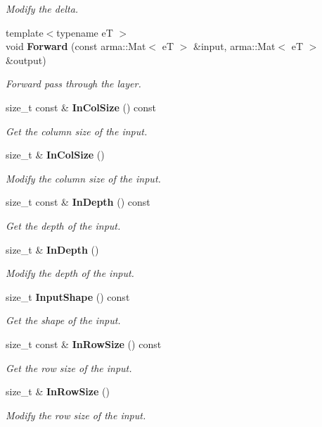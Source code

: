 \begin{DoxyCompactItemize}
\begin{DoxyCompactList}\small\item\em Modify the delta. \end{DoxyCompactList}\item 
{\footnotesize template$<$typename eT $>$ }\\void \textbf{ Forward} (const arma\+::\+Mat$<$ eT $>$ \&input, arma\+::\+Mat$<$ eT $>$ \&output)
\begin{DoxyCompactList}\small\item\em Forward pass through the layer. \end{DoxyCompactList}\item 
size\+\_\+t const  \& \textbf{ In\+Col\+Size} () const
\begin{DoxyCompactList}\small\item\em Get the column size of the input. \end{DoxyCompactList}\item 
size\+\_\+t \& \textbf{ In\+Col\+Size} ()
\begin{DoxyCompactList}\small\item\em Modify the column size of the input. \end{DoxyCompactList}\item 
size\+\_\+t const  \& \textbf{ In\+Depth} () const
\begin{DoxyCompactList}\small\item\em Get the depth of the input. \end{DoxyCompactList}\item 
size\+\_\+t \& \textbf{ In\+Depth} ()
\begin{DoxyCompactList}\small\item\em Modify the depth of the input. \end{DoxyCompactList}\item 
size\+\_\+t \textbf{ Input\+Shape} () const
\begin{DoxyCompactList}\small\item\em Get the shape of the input. \end{DoxyCompactList}\item 
size\+\_\+t const  \& \textbf{ In\+Row\+Size} () const
\begin{DoxyCompactList}\small\item\em Get the row size of the input. \end{DoxyCompactList}\item 
size\+\_\+t \& \textbf{ In\+Row\+Size} ()
\begin{DoxyCompactList}\small\item\em Modify the row size of the input. \end{DoxyCompactList}\item 

\end{DoxyCompactItemize}
